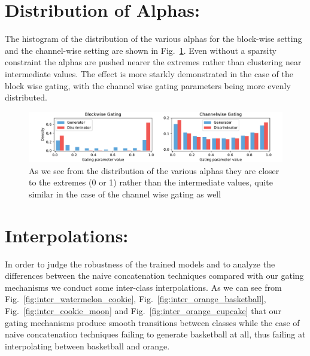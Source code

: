 \documentclass[10pt,twocolumn,letterpaper]{article}
\def\figref#1{Fig.~\ref{#1}}
\begin{document}
\section{Distribution of Alphas:}
The histogram of the distribution of the various alphas for the block-wise setting and the channel-wise setting are shown in \figref{fig:alpha_hist}. Even without a sparsity constraint the alphas are pushed nearer the extremes rather than clustering near intermediate values. The effect is more starkly demonstrated in the case of the block wise gating, with the channel wise gating parameters being more evenly distributed.
\begin{figure}[t]
    \centering
    \includegraphics[width=\linewidth]{alpha_hist.pdf}
    \caption{As we see from the distribution of the various alphas they are closer to the extremes (0 or 1) rather than the intermediate values, quite similar in the case of the channel wise gating as well }
    \label{fig:alpha_hist}
    \vspace{-3mm}
\end{figure}

\section{Interpolations:}
In order to judge the robustness of the trained models and to analyze the differences between the naive concatenation techniques compared with our gating mechanisms we conduct some inter-class interpolations. As we can see from \figref{fig:inter_watermelon_cookie}, \figref{fig:inter_orange_basketball}, \figref{fig:inter_cookie_moon} and \figref{fig:inter_orange_cupcake} that our gating mechanisms produce smooth transitions between classes while the case of naive concatenation techniques failing to generate basketball at all, thus failing at interpolating between basketball and orange.


{\small


}
\end{document}
